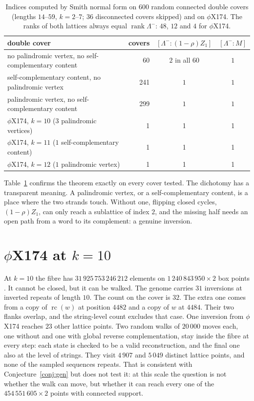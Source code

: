 \documentclass[11pt]{article}
\theoremstyle{plain}
\theoremstyle{definition}
\theoremstyle{remark}
\newcommand{\Lm}{\Lambda^{-}}
\newcommand{\rc}{\operatorname{rc}}
\begin{document}
\begin{table}[t]
\centering\small
\begin{tabular}{lrcc}
\toprule
double cover & covers & $[\Lm:(1-\rho)Z_1]$ & $[\Lm:M]$\\
\midrule
no palindromic vertex, no self-complementary content & 60 & $2$ in all $60$ & $1$\\
self-complementary content, no palindromic vertex & 241 & $1$ & $1$\\
palindromic vertex, no self-complementary content & 299 & $1$ & $1$\\
\midrule
$\phi$X174, $k=10$ ($3$ palindromic vertices) & 1 & 1 & 1\\
$\phi$X174, $k=11$ ($1$ self-complementary content) & 1 & 1 & 1\\
$\phi$X174, $k=12$ ($1$ palindromic vertex) & 1 & 1 & 1\\
\bottomrule
\end{tabular}
\caption{Indices computed by Smith normal form on $600$ random connected double covers (lengths
$14$--$59$, $k=2$--$7$; $36$ disconnected covers skipped) and on $\phi$X174. The ranks of both lattices
always equal $\operatorname{rank}\Lm$: $48$, $12$ and $4$ for $\phi$X174.}\label{tab:tate}
\end{table}

Table~\ref{tab:tate} confirms the theorem exactly on every cover tested. The dichotomy has a transparent
meaning. A palindromic vertex, or a self-complementary content, is a place where the two strands
touch. Without one, flipping closed cycles, $(1-\rho)Z_1$, can only reach a sublattice of index $2$, and
the missing half needs an open path from a word to its complement: a genuine inversion.

\section{$\phi$X174 at $k=10$}\label{sec:phix}

At $k=10$ the fibre has $31\,925\,753\,246\,212$ elements on $1\,240\,843\,950\times2$ box points
\cite{Bio13}. It cannot be closed, but it can be walked. The genome carries $31$ inversions at inverted
repeats of length $10$. The count on the cover is $32$. The extra one comes from a copy of $\rc(w)$ at
position $4482$ and a copy of $w$ at $4484$. Their two flanks overlap, and the string-level count
excludes that case. One inversion from $\phi$X174 reaches $23$ other lattice
points. Two random walks of $20\,000$ moves each, one without and one with global reverse
complementation, stay inside the fibre at every step: each state is checked to be a valid
reconstruction, and the final one also at the level of strings. They visit $4\,907$ and $5\,049$
distinct lattice points, and none of the sampled sequences repeats. That is consistent with
Conjecture~\ref{conj:gen} but does not test it: at this scale the question is not whether the walk can
move, but whether it can reach every one of the $454\,551\,605\times2$ points with connected support.
\end{document}
